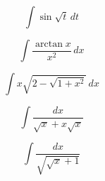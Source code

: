 \documentclass[12pt, letterpaper]{article}
\begin{document}
$$ \int \sin{\sqrt{t}} \, dt $$

\vspace*{0.7in}

$$ \int \frac{\arctan{x}}{{x^2}} \, dx $$

\vspace*{0.7in}

$$ \int x \sqrt{2 - \sqrt{1 + x^2}} \, dx $$

\vspace*{0.7in}

$$ \int \frac{dx}{\sqrt{x} + x\sqrt{x}} $$

\vspace*{0.7in}

$$ \int \frac{dx}{\sqrt{\sqrt{x} + 1}} $$
\end{document}
